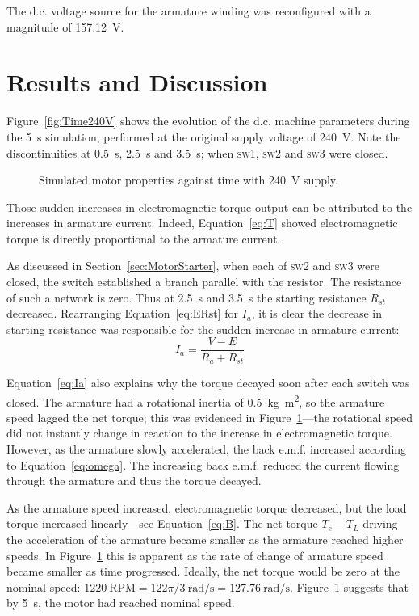 \documentclass[a4paper,11pt,twocolumn]{article}
\newcommand{\s}{\si{\second}\xspace}
\newcommand{\V}{\si{\volt}\xspace}
\newcommand{\rps}{\si{\radian\per\second}\xspace}
\newcommand{\kgmm}{\si{\kilogram\square\metre}\xspace}
\newcommand{\RPM}{\text{RPM}\xspace}
\newcommand{\DC}{d.c.\xspace}
\newcommand{\EMF}{e.m.f.\xspace}
\newcommand{\SW}[1]{\textsc{sw\footnotesize#1}\xspace}
\begin{document}
The \DC voltage source for the armature winding was reconfigured with a
magnitude of 157.12~\V.

\section{Results and Discussion}

Figure~\vref{fig:Time240V} shows the evolution of the \DC machine parameters 
during the 5~\s simulation, performed at the original supply voltage of 240~\V.
Note the discontinuities at 0.5~\s, 2.5~\s and 3.5~\s; when \SW{1}, \SW{2} and
\SW{3} were closed.
\begin{figure}[t]
    \centering
    \def\svgwidth{0.75\textwidth}
    
    \caption{Simulated motor properties against time with 240~\V supply.}
    \label{fig:Time240V}
\end{figure}

Those sudden increases in electromagnetic torque output can be attributed to 
the increases in armature current. Indeed, Equation~\ref{eq:T} showed 
electromagnetic torque is directly proportional to the armature current.

As discussed in Section~\ref{sec:MotorStarter}, when each of \SW{2} and \SW{3} 
were closed, the switch established a branch parallel with the resistor. The 
resistance of such a network is zero. Thus at 2.5~\s and 3.5~\s the starting 
resistance $R_{st}$ decreased. Rearranging Equation~\ref{eq:ERst} for $I_a$, it 
is clear the decrease in starting resistance was responsible for the sudden 
increase in armature current:
\begin{equation} \label{eq:Ia}
    I_a = \frac{V - E}{R_a + R_{st}}
\end{equation}

Equation~\ref{eq:Ia} also explains why the torque decayed soon after 
each switch was closed. The armature had a rotational inertia of 0.5~\kgmm, so 
the armature speed lagged the net torque; this was evidenced in 
Figure~\ref{fig:Time240V}---the rotational speed did not instantly change in 
reaction to the increase in electromagnetic torque. However, as the armature 
slowly accelerated, the back \EMF increased according to 
Equation~\ref{eq:omega}. The increasing back \EMF reduced the current flowing 
through the armature and thus the torque decayed.

As the armature speed increased, electromagnetic torque decreased, but the load 
torque increased linearly---see Equation~\ref{eq:B}. The net torque $T_e - T_L$ 
driving the acceleration of the armature became smaller as the armature reached 
higher speeds. In Figure~\ref{fig:Time240V} this is apparent as the rate of 
change of armature speed became smaller as time progressed. Ideally, the net 
torque would be zero at the nominal speed: $1220~\RPM = 122\pi/3~\rps = 
127.76~\rps$. Figure~\ref{fig:Time240V} suggests that by 5~\s, the motor had 
reached nominal speed.
\end{document}
